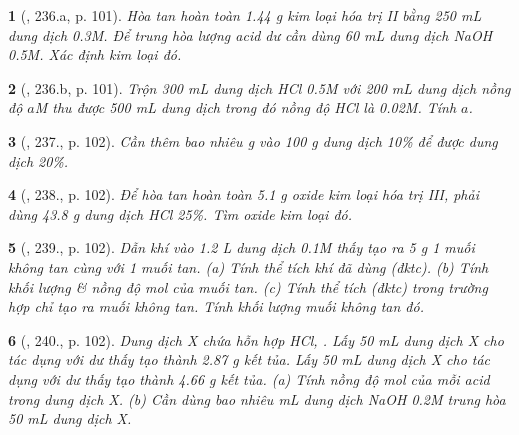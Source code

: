 \documentclass{article}
\newtheorem{baitoan}{}
\begin{document}
\begin{baitoan}[\cite{Nguyen_Buu_Can_500_BT_Hoa_Hoc_THCS}, 236.a, p. 101]
	Hòa tan hoàn toàn {\rm1.44 g} kim loại hóa trị {\rm II} bằng {\rm250 mL} dung dịch {\rm{} 0.3M}. Để trung hòa lượng acid dư cần dùng {\rm60 mL} dung dịch {\rm NaOH 0.5M}. Xác định kim loại đó.
\end{baitoan}

\begin{baitoan}[\cite{Nguyen_Buu_Can_500_BT_Hoa_Hoc_THCS}, 236.b, p. 101]
	Trộn {\rm300 mL} dung dịch {\rm HCl 0.5M} với {\rm200 mL} dung dịch {\rm{}} nồng độ $a${\rm M} thu được {\rm500 mL} dung dịch trong đó nồng độ {\rm HCl} là {\rm0.02M}. Tính $a$.
\end{baitoan}

\begin{baitoan}[\cite{Nguyen_Buu_Can_500_BT_Hoa_Hoc_THCS}, 237., p. 102]
	Cần thêm bao nhiêu {\rm g } vào {\rm100 g} dung dịch {\rm{} 10\%} để được dung dịch {\rm{} 20\%}.
\end{baitoan}

\begin{baitoan}[\cite{Nguyen_Buu_Can_500_BT_Hoa_Hoc_THCS}, 238., p. 102]
	Để hòa tan hoàn toàn {\rm5.1 g} oxide kim loại hóa trị {\rm III}, phải dùng {\rm43.8 g} dung dịch {\rm HCl 25\%}. Tìm oxide kim loại đó.
\end{baitoan}

\begin{baitoan}[\cite{Nguyen_Buu_Can_500_BT_Hoa_Hoc_THCS}, 239., p. 102]
	Dẫn khí {\rm{}} vào {\rm1.2 L} dung dịch {\rm{} 0.1M} thấy tạo ra {\rm5 g} 1 muối không tan cùng với 1 muối tan. (a) Tính thể tích khí {\rm{}} đã dùng (đktc). (b) Tính khối lượng \& nồng độ mol của muối tan. (c) Tính thể tích {\rm{}} (đktc) trong trường hợp chỉ tạo ra muối không tan. Tính khối lượng muối không tan đó.
\end{baitoan}

\begin{baitoan}[\cite{Nguyen_Buu_Can_500_BT_Hoa_Hoc_THCS}, 240., p. 102]
	Dung dịch X chứa hỗn hợp {\rm HCl, }. Lấy {\rm50 mL} dung dịch X cho tác dụng với {\rm{}} dư thấy tạo thành {\rm2.87 g} kết tủa. Lấy {\rm50 mL} dung dịch X cho tác dụng với {\rm{}} dư thấy tạo thành {\rm4.66 g} kết tủa. (a) Tính nồng độ mol của mỗi acid trong dung dịch X. (b) Cần dùng bao nhiêu {\rm mL} dung dịch {\rm NaOH 0.2M} trung hòa {\rm50 mL} dung dịch X.
\end{baitoan}
\end{document}
